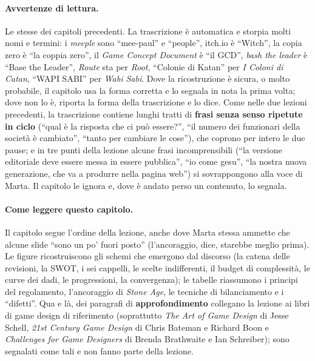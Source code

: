 \paragraph{Avvertenze di lettura.} Le stesse dei capitoli precedenti. La trascrizione è
automatica e storpia molti nomi e termini: i \emph{meeple} sono ``mee-paul'' e ``people'',
itch.io è ``Witch'', la copia zero è ``la coppia zero'', il \emph{Game Concept Document} è ``il
GCD'', \emph{bash the leader} è ``Base the Leader'', \emph{Route} sta per \emph{Root},
``Colonie di Katan'' per \emph{I Coloni di Catan}, ``WAPI SABI'' per \emph{Wabi Sabi}. Dove la
ricostruzione è sicura, o molto probabile, il capitolo usa la forma corretta e lo segnala in
nota la prima volta; dove non lo è, riporta la forma della trascrizione e lo dice. Come nelle
due lezioni precedenti, la trascrizione contiene lunghi tratti di \textbf{frasi senza senso
ripetute in ciclo} (``qual è la risposta che ci può essere?'', ``il numero dei funzionari
della società è cambiato'', ``tanto per cambiare le cose''), che coprono per intero le due
pause; e in tre punti della lezione alcune frasi incomprensibili (``la versione editoriale
deve essere messa in essere pubblica'', ``io come gesu'', ``la nostra nuova generazione, che va
a produrre nella pagina web'') si sovrappongono alla voce di Marta. Il capitolo le ignora e,
dove è andato perso un contenuto, lo segnala.

\paragraph{Come leggere questo capitolo.} Il capitolo segue l'ordine della lezione, anche
dove Marta stessa ammette che alcune slide ``sono un po' fuori posto'' (l'ancoraggio,
dice, starebbe meglio prima). Le figure ricostruiscono gli schemi che emergono dal discorso
(la catena delle revisioni, la SWOT, i sei cappelli, le scelte indifferenti, il budget di
complessità, le curve dei dadi, le progressioni, la convergenza); le tabelle riassumono i
principi del regolamento, l'ancoraggio di \emph{Stone Age}, le tecniche di bilanciamento e i
``difetti''. Qua e là, dei paragrafi di \textbf{approfondimento} collegano la lezione ai
libri di game design di riferimento (soprattutto \emph{The Art of Game Design} di Jesse
Schell, \emph{21st Century Game Design} di Chris Bateman e Richard Boon e
\emph{Challenges for Game Designers} di Brenda Brathwaite e Ian Schreiber); sono segnalati
come tali e non fanno parte della lezione.

